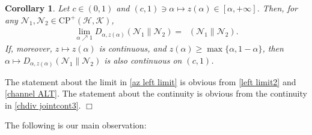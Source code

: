 \documentclass[unsortedaddress,superscriptaddress,pra,notitlepage]{revtex4}
\newtheorem{cor}[definition]{Corollary}
\newenvironment{proof}[1][Proof]{\begin{trivlist}
\item[\hskip \labelsep {\bfseries #1}]}{\hfill$\Box$\end{trivlist}}
\def\N{\mathcal{N}}
\def\hil{{\mathcal H}}
\def\kil{{\mathcal K}}
\def\CP{\mathrm{CP}}
\DeclareMathOperator{\DU}{\mathit{D}^{Um}}
\begin{document}
\begin{cor}\label{cor:az leftcont at1}
Let $c\in(0,1)$ and $(c,1)\ni\alpha\mapsto z(\alpha)\in[\alpha,+\infty]$.
Then, for any $\N_1,\N_2\in\CP^+(\hil,\kil)$,
\begin{align}
\lim_{\alpha\nearrow 1}D_{\alpha,z(\alpha)}(\N_1\|\N_2)=\DU(\N_1\|\N_2).
\label{az left limit}
\end{align}
If, moreover, $z\mapsto z(\alpha)$ is continuous, and $z(\alpha)\ge 
\max\{\alpha,1-\alpha\}$, then 
$\alpha\mapsto D_{\alpha,z(\alpha)}(\N_1\|\N_2)$ is also continuous on $(c,1)$. 
\end{cor}
\begin{proof}
The statement about the limit in \eqref{az left limit}
is obvious from 
\eqref{left limit2} and \eqref{channel ALT}.
The statement about the continuity is obvious from the continuity in 
\eqref{chdiv jointcont3}.
\end{proof}

The following is our main observation:
\end{document}
